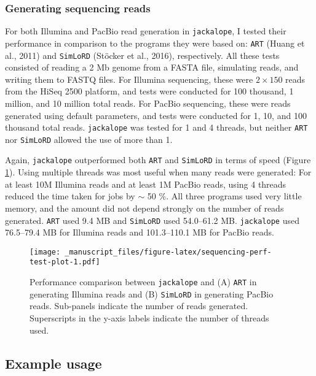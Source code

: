 \documentclass[12pt,]{article}
\begin{document}
\hypertarget{generating-sequencing-reads}{%
\subsubsection{Generating sequencing reads}\label{generating-sequencing-reads}}

For both Illumina and PacBio read generation in \texttt{jackalope}, I tested their performance
in comparison to the programs they were based on:
\texttt{ART} (Huang et al., 2011) and
\texttt{SimLoRD} (Stöcker et al., 2016), respectively.
All these tests consisted of reading a 2 Mb genome from a FASTA file, simulating
reads, and writing them to FASTQ files.
For Illumina sequencing, these were \(2 \times 150\) reads from the HiSeq 2500 platform,
and tests were conducted for 100 thousand, 1 million, and 10 million total reads.
For PacBio sequencing, these were reads generated using default parameters,
and tests were conducted for 1, 10, and 100 thousand total reads.
\texttt{jackalope} was tested for 1 and 4 threads, but
neither \texttt{ART} nor \texttt{SimLoRD} allowed the use of more than 1.

Again, \texttt{jackalope} outperformed both \texttt{ART} and \texttt{SimLoRD} in terms of speed
(Figure \ref{fig:sequencing-perf-test-plot}).
Using multiple threads was most useful when many reads were generated:
For at least 10M Illumina reads and at least 1M PacBio reads, using 4 threads
reduced the time taken for jobs by \(\sim\) 50 \%.
All three programs used very little memory, and the amount did not depend strongly
on the number of reads generated.
\texttt{ART} used 9.4 MB and \texttt{SimLoRD} used 54.0--61.2 MB.
\texttt{jackalope} used 76.5--79.4 MB for Illumina reads and 101.3--110.1 MB for PacBio reads.

\begin{figure}
\centering
\texttt{[image: \_manuscript\_files/figure-latex/sequencing-perf-test-plot-1.pdf]}
\caption{\label{fig:sequencing-perf-test-plot}Performance comparison between \texttt{jackalope} and (A) \texttt{ART} in generating Illumina reads and (B) \texttt{SimLoRD} in generating PacBio reads. Sub-panels indicate the number of reads generated. Superscripts in the y-axis labels indicate the number of threads used.}
\end{figure}

\hypertarget{example-usage}{%
\subsection{Example usage}\label{example-usage}}
\end{document}
